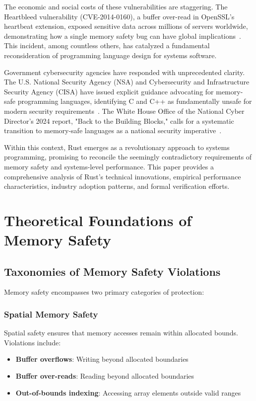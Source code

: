\documentclass[11pt]{article}
\begin{document}
The economic and social costs of these vulnerabilities are staggering. The Heartbleed vulnerability (CVE-2014-0160), a buffer over-read in OpenSSL's heartbeat extension, exposed sensitive data across millions of servers worldwide, demonstrating how a single memory safety bug can have global implications~\cite{heartbleed2014}. This incident, among countless others, has catalyzed a fundamental reconsideration of programming language design for systems software.

Government cybersecurity agencies have responded with unprecedented clarity. The U.S. National Security Agency (NSA) and Cybersecurity and Infrastructure Security Agency (CISA) have issued explicit guidance advocating for memory-safe programming languages, identifying C and C++ as fundamentally unsafe for modern security requirements~\cite{nsa2022guidance,cisa2023urgent}. The White House Office of the National Cyber Director's 2024 report, "Back to the Building Blocks," calls for a systematic transition to memory-safe languages as a national security imperative~\cite{whitehouse2024memo}.

Within this context, Rust emerges as a revolutionary approach to systems programming, promising to reconcile the seemingly contradictory requirements of memory safety and systems-level performance. This paper provides a comprehensive analysis of Rust's technical innovations, empirical performance characteristics, industry adoption patterns, and formal verification efforts.

\section{Theoretical Foundations of Memory Safety}

\subsection{Taxonomies of Memory Safety Violations}

Memory safety encompasses two primary categories of protection:

\subsubsection{Spatial Memory Safety}
Spatial safety ensures that memory accesses remain within allocated bounds. Violations include:
\begin{itemize}
    \item \textbf{Buffer overflows}: Writing beyond allocated boundaries
    \item \textbf{Buffer over-reads}: Reading beyond allocated boundaries
    \item \textbf{Out-of-bounds indexing}: Accessing array elements outside valid ranges
\end{itemize}
\end{document}
